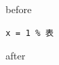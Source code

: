 \documentclass{article}
\begin{document}
before
\begin {verbatim}
x = 1 %
\end{verbatim}
after
\end{document}
